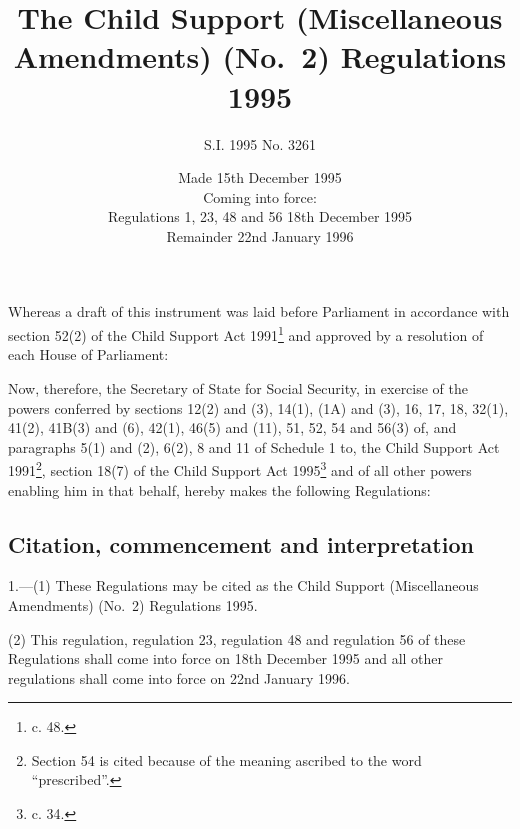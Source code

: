 \documentclass[a4paper]{article}
\title{The Child Support (Miscellaneous Amendments) (No.\ 2) Regulations 1995}
\author{S.I. 1995 No. 3261}
\date{Made 15th December 1995\\Coming into force:\\Regulations 1, 23, 48 and 56 18th December 1995\\Remainder 22nd January 1996}
\begin{document}
\maketitle

\noindent
Whereas a draft of this instrument was laid before Parliament in accordance with section 52(2) of the Child Support Act 1991\footnote{ c. 48.} and approved by a resolution of each House of Parliament:

 Now, therefore, the Secretary of State for Social Security, in exercise of the powers conferred by sections 12(2) and (3), 14(1), (1A) and (3), 16, 17, 18, 32(1), 41(2), 41B(3) and (6), 42(1), 46(5) and (11), 51, 52, 54 and 56(3) of, and paragraphs 5(1) and (2), 6(2), 8 and 11 of Schedule 1 to, the Child Support Act 1991\footnote{\frenchspacing Section 54 is cited because of the meaning ascribed to the word “prescribed”.}, section 18(7) of the Child Support Act 1995\footnote{ c. 34.} and of all other powers enabling him in that behalf, hereby makes the following Regulations:

{\sloppy

\tableofcontents

}

\setcounter{secnumdepth}{-2}

\subsection[1. Citation, commencement and interpretation]{Citation, commencement and interpretation}

1.—(1) These Regulations may be cited as the Child Support (Miscellaneous Amendments) (No.\ 2) Regulations 1995.

(2) This regulation, regulation 23, regulation 48 and regulation 56 of these Regulations shall come into force on 18th December 1995 and all other regulations shall come into force on 22nd January 1996.
\end{document}
